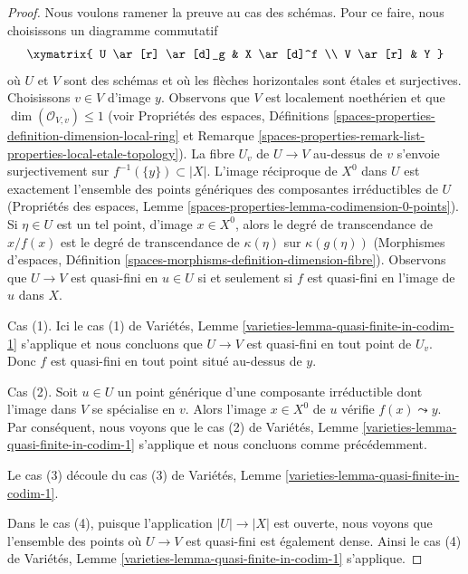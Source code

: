 \begin{proof}
Nous voulons ramener la preuve au cas des schémas. Pour ce faire, nous
choisissons un diagramme commutatif
$$
\xymatrix{
U \ar[r] \ar[d]_g & X \ar[d]^f \\
V \ar[r] & Y
}
$$
où $U$ et $V$ sont des schémas et où les flèches horizontales sont \'etales
et surjectives. Choisissons $v \in V$ d'image $y$. Observons que
$V$ est localement noethérien et que $\dim(\mathcal{O}_{V, v}) \leq 1$
(voir Propriétés des espaces, Définitions
\ref{spaces-properties-definition-dimension-local-ring} et
Remarque \ref{spaces-properties-remark-list-properties-local-etale-topology}).
La fibre $U_v$ de $U \to V$ au-dessus de $v$ s'envoie surjectivement sur
$f^{-1}(\{y\}) \subset |X|$. L'image réciproque de $X^0$ dans $U$
est exactement l'ensemble des
points génériques des composantes irréductibles de $U$ (Propriétés des espaces, Lemme
\ref{spaces-properties-lemma-codimension-0-points}).
Si $\eta \in U$ est un tel point, d'image $x \in X^0$, alors
le degré de transcendance de $x / f(x)$ est le degré de transcendance de
$\kappa(\eta)$ sur $\kappa(g(\eta))$
(Morphismes d'espaces, Définition
\ref{spaces-morphisms-definition-dimension-fibre}).
Observons que $U \to V$ est quasi-fini en $u \in U$ si et seulement si
$f$ est quasi-fini en l'image de $u$ dans $X$.

\medskip\noindent
Cas (1). Ici le cas (1) de
Variétés, Lemme \ref{varieties-lemma-quasi-finite-in-codim-1} s'applique
et nous concluons que $U \to V$ est quasi-fini en tout point de $U_v$.
Donc $f$ est quasi-fini en tout point situé au-dessus de $y$.

\medskip\noindent
Cas (2). Soit $u \in U$ un point générique d'une composante irréductible
dont l'image dans $V$ se spécialise en $v$. Alors l'image $x \in X^0$ de
$u$ vérifie $f(x) \leadsto y$. Par conséquent, nous voyons que
le cas (2) de
Variétés, Lemme \ref{varieties-lemma-quasi-finite-in-codim-1} s'applique
et nous concluons comme précédemment.

\medskip\noindent
Le cas (3) découle du cas (3) de
Variétés, Lemme \ref{varieties-lemma-quasi-finite-in-codim-1}.

\medskip\noindent
Dans le cas (4), puisque l'application $|U| \to |X|$ est ouverte, nous voyons que
l'ensemble des points où $U \to V$ est quasi-fini est également dense.
Ainsi le cas (4) de
Variétés, Lemme \ref{varieties-lemma-quasi-finite-in-codim-1} s'applique.
\end{proof}

